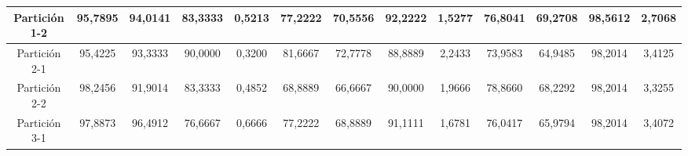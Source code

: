 \documentclass[12pt]{article}
\begin{document}
\begin{table}[H]
{\begin{tabular}{|c|cccc|cccc|cccc|}
Partición 1-2 & \multicolumn{1}{c|}{95,7895}                                                  & \multicolumn{1}{c|}{94,0141}                                                 & \multicolumn{1}{c|}{83,3333} & 0,5213 & \multicolumn{1}{c|}{77,2222}                                                  & \multicolumn{1}{c|}{70,5556}                                                 & \multicolumn{1}{c|}{92,2222} & 1,5277 & \multicolumn{1}{c|}{76,8041}                                                  & \multicolumn{1}{c|}{69,2708}                                                 & \multicolumn{1}{c|}{98,5612} & 2,7068 \\ \hline
Partición 2-1 & \multicolumn{1}{c|}{95,4225}                                                  & \multicolumn{1}{c|}{93,3333}                                                 & \multicolumn{1}{c|}{90,0000} & 0,3200 & \multicolumn{1}{c|}{81,6667}                                                  & \multicolumn{1}{c|}{72,7778}                                                 & \multicolumn{1}{c|}{88,8889} & 2,2433 & \multicolumn{1}{c|}{73,9583}                                                  & \multicolumn{1}{c|}{64,9485}                                                 & \multicolumn{1}{c|}{98,2014} & 3,4125 \\ \hline
Partición 2-2 & \multicolumn{1}{c|}{98,2456}                                                  & \multicolumn{1}{c|}{91,9014}                                                 & \multicolumn{1}{c|}{83,3333} & 0,4852 & \multicolumn{1}{c|}{68,8889}                                                  & \multicolumn{1}{c|}{66,6667}                                                 & \multicolumn{1}{c|}{90,0000} & 1,9666 & \multicolumn{1}{c|}{78,8660}                                                  & \multicolumn{1}{c|}{68,2292}                                                 & \multicolumn{1}{c|}{98,2014} & 3,3255 \\ \hline
Partición 3-1 & \multicolumn{1}{c|}{97,8873}                                                  & \multicolumn{1}{c|}{96,4912}                                                 & \multicolumn{1}{c|}{76,6667} & 0,6666 & \multicolumn{1}{c|}{77,2222}                                                  & \multicolumn{1}{c|}{68,8889}                                                 & \multicolumn{1}{c|}{91,1111} & 1,6781 & \multicolumn{1}{c|}{76,0417}                                                  & \multicolumn{1}{c|}{65,9794}                                                 & \multicolumn{1}{c|}{98,2014} & 3,4072 \\ \hline

\end{tabular}}
\end{table}
\end{document}
